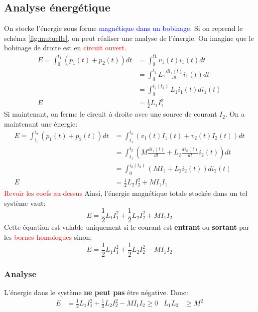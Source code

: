 \documentclass{report}
\begin{document}
\subsection{Analyse énergétique}
On stocke l'énergie sous forme \textcolor{blue}{magnétique dans un bobinage}. Si on reprend le schéma \ref{fig:mutuelle}, on peut réaliser une analyse de l'énergie. On imagine que le bobinage de droite est en \textcolor{red}{circuit ouvert}.
\begin{align*}
E = \int_0^{t_1} (p_1(t) + p_2(t)) dt &= \int_0^{t1}v_1 (t) i_1 (t) dt\\
&= \int_0^{t_1} L_1 \frac{di_1 (t)}{dt} i_1 (t) dt\\
&= \int_0^{i_1 (t_1)} L_1 i_1(t) di_1(t)\\
E &= \frac{1}{2} L_1 I_1^2
\end{align*}
Si maintenant, on ferme le circuit à droite avec une source de courant $I_2$. On a maintenant une énergie:
\begin{align*}
E = \int_{t_1}^{t_2} (p_1(t) + p_2(t)) dt &= \int_{t_1}^{t_2} (v_1 (t) I_1 (t) + v_2(t) I_2 (t)) dt\\
&= \int_{t_1}^{t_2} \left( M \frac{di_1 (t)}{dt} + L_2 \frac{di_2 (t)}{dt} i_2 (t) \right) dt\\
&= \int_{0}^{i_2(t_2)} (M I_1 + L_2 i_2(t)) di_2(t)\\
E &= \frac{1}{2} L_2 I_2^2 + MI_1 I_1
\end{align*}
\textcolor{red}{Revoir les coefs au-dessus}
Ainsi, l'énergie magnétique totale stockée dans un tel système vaut:
\begin{equation}
E = \frac{1}{2} L_1 I_1^2 + \frac{1}{2} L_2 I_2^2 + MI_1 I_2
\end{equation}
Cette équation est valable uniquement si le courant est \textbf{entrant} ou \textbf{sortant} par les \textcolor{red}{bornes homologues} sinon:
\begin{equation}
E = \frac{1}{2} L_1 I_1^2 + \frac{1}{2} L_2 I_2^2 - MI_1 I_2
\end{equation}

\subsubsection{Analyse}
L'énergie dans le système \textbf{ne peut pas} être négative. Donc:
\begin{align*}
E &= \frac{1}{2} L_1 I_1^2 + \frac{1}{2} L_2 I_2^2 - M I_1 I_2 \geqslant 0 & L_1 L_2 &\geqslant M^2
\end{align*}
\end{document}
